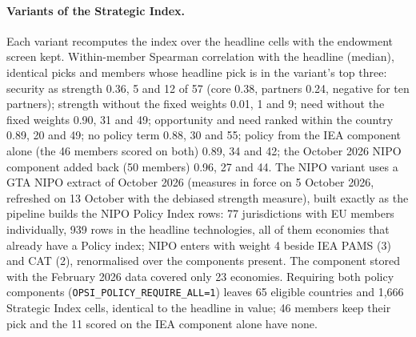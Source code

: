 \paragraph{Variants of the Strategic Index.} Each variant recomputes the index over the headline
cells with the endowment screen kept. Within-member Spearman correlation with the headline (median),
identical picks and members whose headline pick is in the variant's top three:
security as strength 0.36, 5 and 12 of 57 (core 0.38, partners 0.24, negative for ten partners);
strength without the fixed weights 0.01, 1 and 9; need without the fixed weights 0.90, 31 and 49;
opportunity and need ranked within the country 0.89, 20 and 49; no policy term 0.88, 30 and 55;
policy from the IEA component alone (the 46 members scored on both) 0.89, 34 and 42; the October
2026 NIPO component added back (50 members) 0.96, 27 and 44. The NIPO variant uses a GTA NIPO
extract of October 2026 (measures in force on 5 October 2026, refreshed on 13 October with the
debiased strength measure), built exactly as the pipeline builds the NIPO Policy Index rows: 77
jurisdictions with EU members individually, 939 rows in the headline technologies, all of them
economies that already have a Policy index; NIPO enters with weight 4 beside IEA PAMS (3) and CAT
(2), renormalised over the components present. The component stored with the February 2026 data
covered only 23 economies. Requiring both policy components (\texttt{OPSI\_POLICY\_REQUIRE\_ALL=1})
leaves 65 eligible countries and 1,666 Strategic Index cells, identical to the headline in value;
46 members keep their pick and the 11 scored on the IEA component alone have none.
